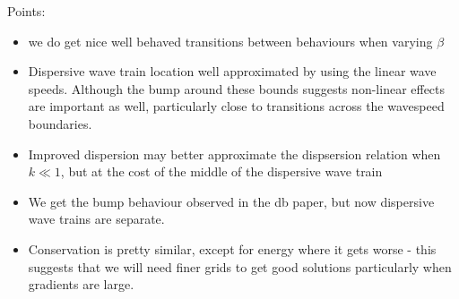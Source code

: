 \documentclass[10pt]{article}
\begin{document}
Points:
\begin{itemize}
	\item we do get nice well behaved transitions between behaviours when varying $\beta$
	\item Dispersive wave train location well approximated by using the linear wave speeds. Although the bump around these bounds suggests non-linear effects are important as well, particularly close to transitions across the wavespeed boundaries. 
	\item Improved dispersion may better approximate the dispsersion relation when $k\ll 1$, but at the cost of the middle of the dispersive wave train
	\item We get the bump behaviour observed in the db paper, but now dispersive wave trains are separate.
	\item Conservation is pretty similar, except for energy where it gets worse - this suggests that we will need finer grids to get good solutions particularly when gradients are large.
\end{itemize}
\end{document}
